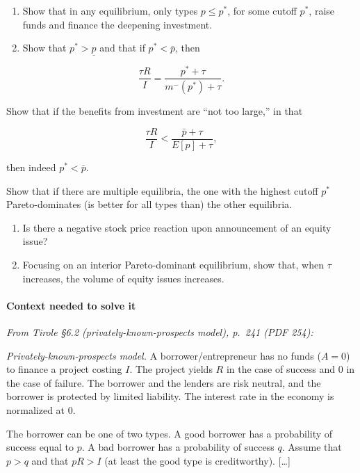 \documentclass[11pt,a4paper]{article}
\begin{document}
\begin{enumerate}
\def\labelenumi{(\roman{enumi})}
\item
  Show that in any equilibrium, only types \(p \leqslant p^*\), for some cutoff \(p^*\), raise funds
  and finance the deepening investment.
\item
  Show that \(p^* > \underline{p}\) and that if \(p^* < \bar{p}\), then
\end{enumerate}

\[\frac{\tau R}{I} = \frac{p^* + \tau}{m^-(p^*) + \tau}.\]

Show that if the benefits from investment are ``not too large,'' in that

\[\frac{\tau R}{I} < \frac{\bar{p} + \tau}{E[p] + \tau},\]

then indeed \(p^* < \bar{p}\).

Show that if there are multiple equilibria, the one with the highest cutoff \(p^*\) Pareto-dominates
(is better for all types than) the other equilibria.

\begin{enumerate}
\def\labelenumi{(\roman{enumi})}
\setcounter{enumi}{2}
\item
  Is there a negative stock price reaction upon announcement of an equity issue?
\item
  Focusing on an interior Pareto-dominant equilibrium, show that, when \(\tau\) increases, the
  volume of equity issues increases.
\end{enumerate}

\paragraph{Context needed to solve it}

\emph{From Tirole §6.2 (privately-known-prospects model), p.~241 (PDF 254):}

\emph{Privately-known-prospects model.} A borrower/entrepreneur has no funds (\(A = 0\)) to finance
a project costing \(I\). The project yields \(R\) in the case of success and 0 in the case of
failure. The borrower and the lenders are risk neutral, and the borrower is protected by limited
liability. The interest rate in the economy is normalized at 0.

The borrower can be one of two types. A good borrower has a probability of success equal to \(p\). A
bad borrower has a probability of success \(q\). Assume that \(p > q\) and that \(pR > I\) (at least
the good type is creditworthy). {[}\ldots{]}
\end{document}
